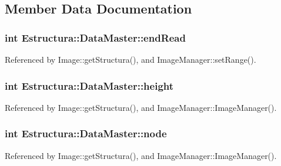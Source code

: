 \subsection{Member Data Documentation}
\subsubsection[{\texorpdfstring{end\+Read}{endRead}}]{\setlength{\rightskip}{0pt plus 5cm}int Estructura\+::\+Data\+Master\+::end\+Read}\hypertarget{structEstructura_1_1DataMaster_a787807eccc80c8e639d2409477f37f3a}{}\label{structEstructura_1_1DataMaster_a787807eccc80c8e639d2409477f37f3a}


Referenced by Image\+::get\+Structura(), and Image\+Manager\+::set\+Range().

\subsubsection[{\texorpdfstring{height}{height}}]{\setlength{\rightskip}{0pt plus 5cm}int Estructura\+::\+Data\+Master\+::height}\hypertarget{structEstructura_1_1DataMaster_a33df1604c867e22af955f29c453d6651}{}\label{structEstructura_1_1DataMaster_a33df1604c867e22af955f29c453d6651}


Referenced by Image\+::get\+Structura(), and Image\+Manager\+::\+Image\+Manager().

\subsubsection[{\texorpdfstring{node}{node}}]{\setlength{\rightskip}{0pt plus 5cm}int Estructura\+::\+Data\+Master\+::node}\hypertarget{structEstructura_1_1DataMaster_a5b7bf8e1c983ad0a64dd596d1bb4e31a}{}\label{structEstructura_1_1DataMaster_a5b7bf8e1c983ad0a64dd596d1bb4e31a}


Referenced by Image\+::get\+Structura(), and Image\+Manager\+::\+Image\+Manager().

